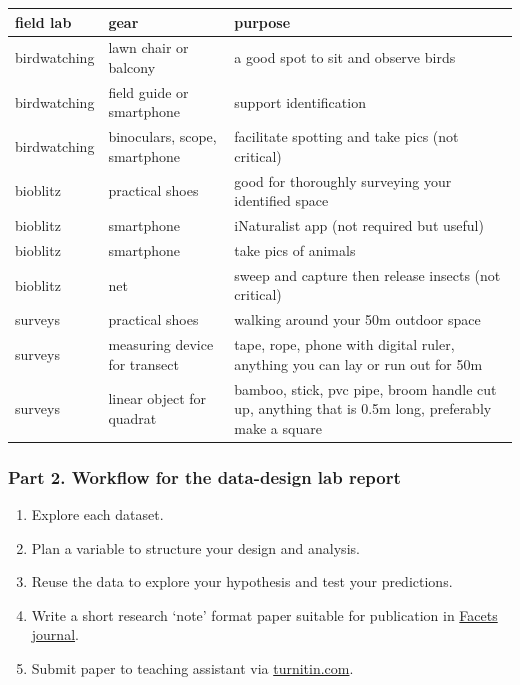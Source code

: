\documentclass[
]{book}
\providecommand{\tightlist}{%
  \setlength{\itemsep}{0pt}\setlength{\parskip}{0pt}}
\begin{document}
\begin{tabular}{lll}
\toprule
field lab & gear & purpose\\
\midrule
birdwatching & lawn chair or balcony & a good spot to sit and observe birds\\
birdwatching & field guide or smartphone & support identification\\
birdwatching & binoculars, scope, smartphone & facilitate spotting and take pics (not critical)\\
bioblitz & practical shoes & good for thoroughly surveying your identified space\\
bioblitz & smartphone & iNaturalist app (not required but useful)\\
\addlinespace
bioblitz & smartphone & take pics of animals\\
bioblitz & net & sweep and capture then release insects (not critical)\\
surveys & practical shoes & walking around your 50m outdoor space\\
surveys & measuring device for transect & tape, rope, phone with digital ruler, anything you can lay or run out for 50m\\
surveys & linear object for quadrat & bamboo, stick, pvc pipe, broom handle cut up, anything that is 0.5m long, preferably make a square\\
\bottomrule
\end{tabular}

\hypertarget{part-2.-workflow-for-the-data-design-lab-report}{%
\subsubsection*{Part 2. Workflow for the data-design lab report}\label{part-2.-workflow-for-the-data-design-lab-report}}

\begin{enumerate}
\def\labelenumi{\arabic{enumi}.}
\tightlist
\item
  Explore each dataset.\\
\item
  Plan a variable to structure your design and analysis.\\
\item
  Reuse the data to explore your hypothesis and test your predictions.\\
\item
  Write a short research `note' format paper suitable for publication in \href{https://www.facetsjournal.com/}{Facets journal}.\\
\item
  Submit paper to teaching assistant via \href{https://www.turnitin.com}{turnitin.com}.
\end{enumerate}
\end{document}
